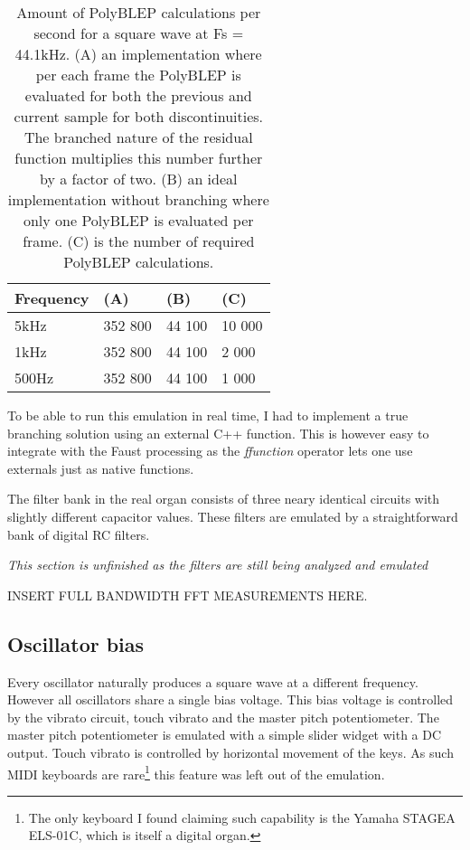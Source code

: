 \documentclass[11pt,a4paper]{article}
\begin{document}
\begin{table}[h]
 \begin{center}
\begin{tabular}{|l|l|l|l|}

      \hline
      Frequency & (A)        &  (B)         & (C) \\
      \hline\hline
      5kHz     & 352 800     & 44 100       & 10 000\\
      1kHz     & 352 800     & 44 100       &  2 000\\
      500Hz    & 352 800     & 44 100       &  1 000\\
      \hline

\end{tabular}
\caption{Amount of PolyBLEP calculations per second for a square wave at Fs = 44.1kHz. 
(A) an implementation where per each frame the PolyBLEP is evaluated for both the previous and current sample for both discontinuities. The branched nature of the residual function multiplies this number further by a factor of two.
(B) an ideal implementation without branching where only one PolyBLEP is evaluated per frame.
(C) is the number of required PolyBLEP calculations.  }\label{table:polyblep-amount}
 \end{center}
\end{table}

To be able to run this emulation in real time, I had to implement a true branching solution using an external C++ function. This is however easy to integrate with the Faust processing as the \emph{ffunction} operator lets one use externals just as native functions.

The filter bank in the real organ consists of three neary identical circuits with slightly different capacitor values. These filters are emulated by a straightforward bank of digital RC filters.


\emph{This section is unfinished as the filters are still being analyzed and emulated}

INSERT FULL BANDWIDTH FFT MEASUREMENTS HERE.

\subsection{Oscillator bias}
\label{section:oscillator-bias}

Every oscillator naturally produces a square wave at a different frequency. However all oscillators share a single bias voltage. This bias voltage is controlled by the vibrato circuit, touch vibrato and the master pitch potentiometer. The master pitch potentiometer is emulated with a simple slider widget with a DC output. Touch vibrato is controlled by horizontal movement of the keys. As such MIDI keyboards are rare\footnote{The only keyboard I found claiming such capability is the Yamaha STAGEA ELS-01C, which is itself a digital organ.} this feature was left out of the emulation.
\end{document}
